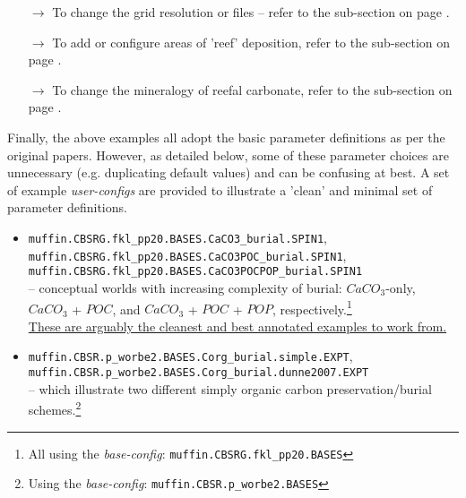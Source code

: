 \begin{enumerate}[noitemsep]
\vspace{1mm}
\begin{itemize}[noitemsep]
\setlength{\itemindent}{-0.125 in}
\item [\(\rightarrow\)] To change the grid resolution or files -- refer to the sub-section on page \pageref{subsec:run_the_sediments_at_higher_resolution}.
\item [\(\rightarrow\)] To add or configure areas of 'reef' deposition, refer to the sub-section on page \pageref{subsec:include_shallow_water_depositional_systems}.
\item [\(\rightarrow\)] To change the mineralogy of reefal carbonate, refer to the sub-section on page \pageref{subsec:specify_a_particular_carbonate_mineralogy}.
\end{itemize}

\vspace{1mm}
Finally, the above examples all adopt the basic parameter definitions as per the original papers. However, as detailed below, some of these parameter choices are unnecessary (e.g. duplicating default values) and can be confusing at best. A set of example \textit{user-configs} are provided to illustrate a 'clean' and minimal set of parameter definitions.

\begin{itemize}[noitemsep]
\vspace{1mm}
\item \texttt{muffin.CBSRG.fkl\_pp20.BASES.CaCO3\_burial.SPIN1}, \\\texttt{muffin.CBSRG.fkl\_pp20.BASES.CaCO3POC\_burial.SPIN1}, \\\texttt{muffin.CBSRG.fkl\_pp20.BASES.CaCO3POCPOP\_burial.SPIN1}
\\-- conceptual worlds with increasing complexity of burial: \(CaCO_{3}\)-only, \(CaCO_{3}\) + \(POC\), and \(CaCO_{3}\) + \(POC\) + \(POP\), respectively.\footnote{All using the \textit{base-config}: \texttt{muffin.CBSRG.fkl\_pp20.BASES}} 
\\\uline{These are arguably the cleanest and best annotated examples to work from.}
\vspace{1mm}
\item \texttt{muffin.CBSR.p\_worbe2.BASES.Corg\_burial.simple.EXPT}, \\\texttt{muffin.CBSR.p\_worbe2.BASES.Corg\_burial.dunne2007.EXPT}
\\-- which illustrate two different simply organic carbon preservation/burial schemes.\footnote{Using the \textit{base-config}: \texttt{muffin.CBSR.p\_worbe2.BASES}}
\end{itemize}


\end{enumerate}
